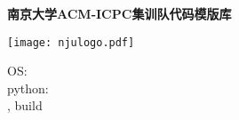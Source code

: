 \documentclass[9pt,landscape]{article}
\begin{document}
\thispagestyle{empty}
\null\vfill
\begin{center}
  \Huge \textbf{南京大学ACM-ICPC集训队代码模版库} \\
\vspace{1.5cm}

\texttt{[image: njulogo.pdf]}
\end{center}

\vspace{2cm}

\begin{minipage}{0.5\linewidth}
OS: \platform \\ 
python: \pythonver \\
\buildtime, build \buildno
\end{minipage}
\vfill
\clearpage

\begin{multicols}{2}
\tableofcontents
\end{multicols}

\newpage


\begin{multicols}{2}

\end{multicols}
\end{document}
